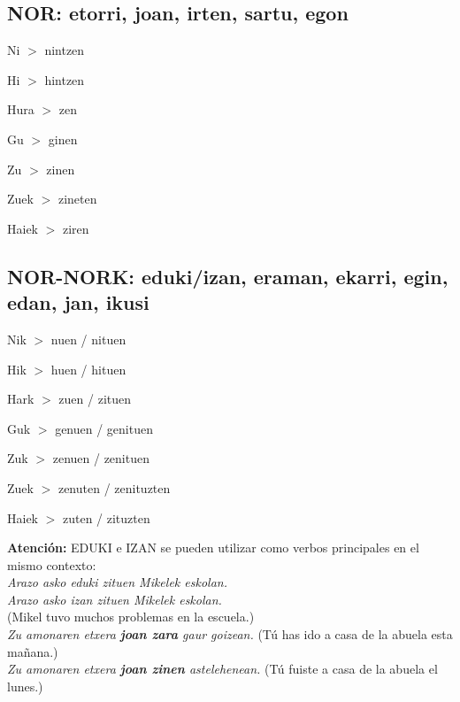 \documentclass[11pt, a4paper]{article}
\begin{document}
\subsection{NOR: etorri, joan, irten, sartu, egon}
\begin{itemize}
\begin{multicols}{2}
\item Ni $>$ nintzen
\item Hi $>$ hintzen
\item Hura $>$ zen\\
\item Gu $>$ ginen
\item Zu $>$ zinen
\item Zuek $>$ zineten
\item Haiek $>$ ziren
\end{multicols}
\end{itemize}

\subsection{NOR-NORK: eduki/izan, eraman, ekarri, egin, edan, jan, ikusi}
\begin{itemize}
\begin{multicols}{2}
\item Nik $>$ nuen / nituen
\item Hik $>$ huen / hituen
\item Hark $>$ zuen / zituen\\
\item Guk $>$ genuen / genituen
\item Zuk $>$ zenuen / zenituen
\item Zuek $>$ zenuten / zenituzten
\item Haiek $>$ zuten / zituzten
\end{multicols}
\end{itemize}

\noindent \textbf{Atención:} EDUKI e IZAN se pueden utilizar como verbos principales en el mismo contexto:\\
\indent \textit{Arazo asko eduki zituen Mikelek eskolan.}\\
\indent \textit{Arazo asko izan zituen Mikelek eskolan.}\\
\indent (Mikel tuvo muchos problemas en la escuela.)\\



\indent \textit{Zu amonaren etxera \textbf{joan zara} gaur goizean.}
(Tú has ido a casa de la abuela esta mañana.)\\
\indent \textit{Zu amonaren etxera \textbf{joan zinen} astelehenean.}
(Tú fuiste a casa de la abuela el lunes.)\\
\end{document}
